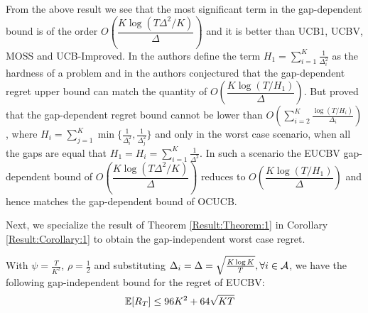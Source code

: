 From the above result we see that the most significant term in the gap-dependent bound is of the order $O\left(\dfrac{K\log{(T\Delta^{2}/K)}}{\Delta}\right)$ and it is better than UCB1, UCBV, MOSS and UCB-Improved. In \citet{audibert2010best} the authors define the term $H_1=\sum_{i=1}^{K}\frac{1}{\Delta_i^2}$ as the hardness of a problem and in \citet{bubeck2012regret} the authors conjectured that the gap-dependent regret upper bound can match the quantity of $O\left(\dfrac{K\log{(T/H_1)}}{\Delta}\right)$. But \citet{lattimore2015optimally} proved that the gap-dependent regret bound cannot be lower than $O\left(\sum_{i=2}^{K}\frac{\log\left(T/H_i\right)}{\Delta_i}\right)$, where $H_i=\sum_{j=1}^{K}\min\lbrace \frac{1}{\Delta_i^2},\frac{1}{\Delta_j^2}\rbrace$ and only in the worst case scenario, when all the gaps are equal that $H_1=H_{i}=\sum_{i=1}^{K}\frac{1}{\Delta^2}$. In such a scenario the EUCBV gap-dependent bound of $O\left(\dfrac{K\log{(T\Delta^{2}/ K)}}{\Delta}\right)$ reduces to $O\left(\dfrac{K\log{(T/H_1)}}{\Delta}\right)$ and hence matches the gap-dependent bound of OCUCB.

Next, we specialize the result of Theorem \ref{Result:Theorem:1} in Corollary \ref{Result:Corollary:1} to  obtain the gap-independent worst case regret. %



\begin{corollary}
\label{Result:Corollary:1}
With $\psi=\frac{T}{K^2}$, $\rho=\frac{1}{2}$ and substituting $\Delta_i =\Delta = \sqrt{\frac{K\log K}{T}}, \forall i\in \mathcal{A}$, we have the following gap-independent bound for the regret of EUCBV:
\begin{align*}
\mathbb{E}[R_{T}] & \leq 96 K^2 + 64\sqrt{KT}
	\end{align*} 
\end{corollary}

